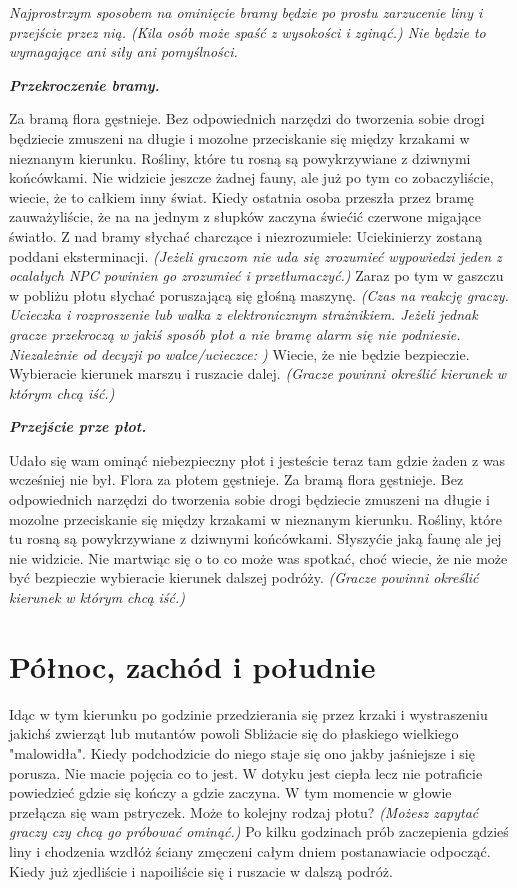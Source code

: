 \documentclass{article}
\begin{document}
    \bigskip
    \slshape
    Najprostrzym sposobem na ominięcie bramy będzie po prostu zarzucenie liny i przejście przez nią. (Kila osób może spaść z wysokości i zginąć.) Nie będzie to wymagające ani siły ani pomyślności.

    \bigskip
    \normalfont
    \emph{\textbf{Przekroczenie bramy.}}

    Za bramą flora gęstnieje. Bez odpowiednich narzędzi do tworzenia sobie drogi będziecie zmuszeni na długie i mozolne przeciskanie się między krzakami w nieznanym kierunku. Rośliny, które tu rosną są powykrzywiane z dziwnymi końcówkami. Nie widzicie jeszcze żadnej fauny, ale już po tym co zobaczyliście, wiecie, że to całkiem inny świat. Kiedy ostatnia osoba przeszła przez bramę zauważyliście, że na na jednym z słupków zaczyna świećić czerwone migające światło. Z nad bramy słychać charczące i niezrozumiele: Uciekinierzy zostaną poddani eksterminacji. \emph{(Jeżeli graczom nie uda się zrozumieć wypowiedzi jeden z ocalałych NPC powinien go zrozumieć i przetłumaczyć.)} Zaraz po tym w gaszczu w pobliżu płotu słychać poruszającą się głośną maszynę. \emph{(Czas na reakcję graczy. Ucieczka i rozproszenie lub walka z elektronicznym strażnikiem. Jeżeli jednak gracze przekroczą w jakiś sposób płot a nie bramę alarm się nie podniesie. Niezależnie od decyzji po walce/ucieczce: )} Wiecie, że nie będzie bezpieczie. Wybieracie kierunek marszu i ruszacie dalej. \emph{(Gracze powinni określić kierunek w którym chcą iść.)}

    \bigskip
    \normalfont
    \emph{\textbf{Przejście prze płot.}}

    Udało się wam ominąć niebezpieczny płot i jesteście teraz tam gdzie żaden z was wcześniej nie był. Flora za płotem gęstnieje. Za bramą flora gęstnieje. Bez odpowiednich narzędzi do tworzenia sobie drogi będziecie zmuszeni na długie i mozolne przeciskanie się między krzakami w nieznanym kierunku. Rośliny, które tu rosną są powykrzywiane z dziwnymi końcówkami. Słyszyćie jaką faunę ale jej nie widzicie. Nie martwiąc się o to co może was spotkać, choć wiecie, że nie może być bezpieczie wybieracie kierunek dalszej podróży. \emph{(Gracze powinni określić kierunek w którym chcą iść.)}

    \section{Północ, zachód i południe}

    Idąc w tym kierunku po godzinie przedzierania się przez krzaki i wystraszeniu jakichś zwierząt lub mutantów powoli Sbliżacie się do płaskiego wielkiego "malowidła". Kiedy podchodzicie do niego staje się ono jakby jaśniejsze i się porusza. Nie macie pojęcia co to jest. W dotyku jest ciepła lecz nie potraficie powiedzieć gdzie się kończy a gdzie zaczyna. W tym momencie w głowie przełącza się wam pstryczek. Może to kolejny rodzaj płotu? \emph{(Możesz zapytać graczy czy chcą go próbować ominąć.)} Po kilku godzinach prób zaczepienia gdzieś liny i chodzenia wzdłóż ściany zmęczeni całym dniem postanawiacie odpocząć. Kiedy już zjedliście i napoiliście się i ruszacie w dalszą podróż.
\end{document}
